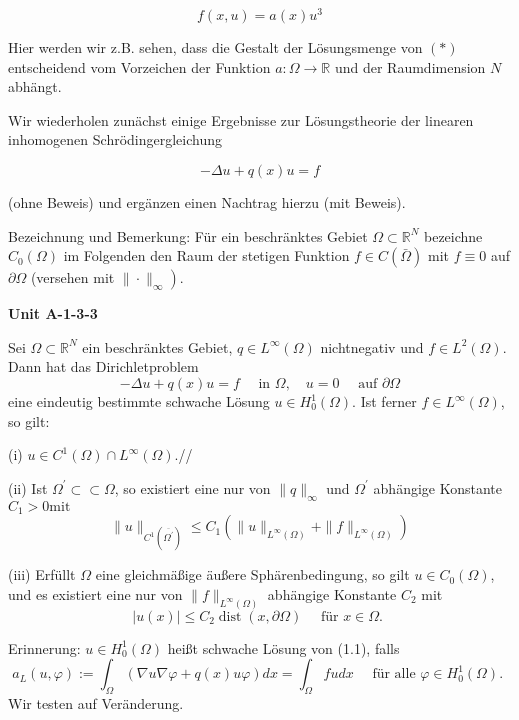 \documentclass[10pt, letterpaper]{article}
\newenvironment{unit}[1]
  {\begin{unitbox}\textbf{Unit #1}\par\smallskip}
  {\end{unitbox}}
\begin{document}
$$
f(x, u)=a(x) u^{3}
$$

Hier werden wir z.B. sehen, dass die Gestalt der Lösungsmenge von $(*)$ entscheidend vom Vorzeichen der Funktion $a: \Omega \rightarrow \mathbb{R}$ und der Raumdimension $N$ abhängt.

Wir wiederholen zunächst einige Ergebnisse zur Lösungstheorie der linearen inhomogenen Schrödingergleichung

$$
-\Delta u+q(x) u=f
$$

(ohne Beweis) und ergänzen einen Nachtrag hierzu (mit Beweis).

Bezeichnung und Bemerkung: Für ein beschränktes Gebiet $\Omega \subset \mathbb{R}^{N}$ bezeichne $C_{0}(\Omega)$ im Folgenden den Raum der stetigen Funktion $f \in C(\bar{\Omega})$ mit $f \equiv 0$ auf $\partial \Omega$ (versehen mit $\left.\|\cdot\|_{\infty}\right)$.












\begin{unit}{A-1-3-3}
Sei $\Omega \subset \mathbb{R}^{N}$ ein beschränktes Gebiet, $q \in L^{\infty}(\Omega)$ nichtnegativ und $f \in L^{2}(\Omega)$. Dann hat das Dirichletproblem
$$
-\Delta u+q(x) u=f \quad \text { in } \Omega, \quad u=0 \quad \text { auf } \partial \Omega
$$
eine eindeutig bestimmte schwache Lösung $u \in H_{0}^{1}(\Omega)$. Ist ferner $f \in L^{\infty}(\Omega)$, so gilt:

(i) $u \in C^{1}(\Omega) \cap L^{\infty}(\Omega)$.//

(ii) Ist $\Omega^{\prime} \subset \subset \Omega$, so existiert eine nur von $\|q\|_{\infty}$ und $\Omega^{\prime}$ abhängige Konstante $C_{1}>0 \mathrm{mit}$
$$
\|u\|_{C^{1}\left(\overline{\Omega^{\prime}}\right)} \leq C_{1}\left(\|u\|_{L^{\infty}(\Omega)}+\|f\|_{L^{\infty}(\Omega)}\right)
$$

(iii) Erfüllt $\Omega$ eine gleichmäßige äußere Sphärenbedingung, so gilt $u \in C_{0}(\Omega)$, und es existiert eine nur von $\|f\|_{L^{\infty}(\Omega)}$ abhängige Konstante $C_{2}$ mit
$$
|u(x)| \leq C_{2} \operatorname{dist}(x, \partial \Omega) \quad \text { für } x \in \Omega \text {. }
$$

Erinnerung: $u \in H_{0}^{1}(\Omega)$ heißt schwache Lösung von (1.1), falls
$$
a_{L}(u, \varphi):=\int_{\Omega}(\nabla u \nabla \varphi+q(x) u \varphi) d x=\int_{\Omega} f u d x \quad \text { für alle } \varphi \in H_{0}^{1}(\Omega) \text {. }
$$
Wir testen auf Veränderung.
\end{unit}
\end{document}
